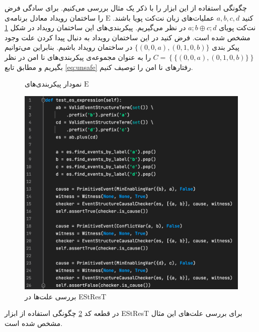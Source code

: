 \documentclass[
msc,
irfonts
]{./tex/tehran-thesis}
\newcommand{\پ}{پروژه/پایان‌نامه/رساله }
\theoremstyle{definition}
\theoremstyle{theorem}
\theoremstyle{definition}
\numberwithin{algorithm}{chapter}
\newcommand{\s}[1]{\{#1\}}
\newcommand{\crd}[4][above]{
    \node[draw,circle,inner sep=2pt,fill,label={[#1]:#4}] at (#2,#3) {};
}
\newcommand{\mr}[1]{\mathrm{#1}}
\begin{document}
چگونگی استفاده از این ابزار را با ذکر یک مثال بررسی می‌کنیم.
برای سادگی فرض کنید 
$a,b,c,d$
عملیات‌های زبان نت‌کت پویا باشند.
$\mr{E}$
را ساختمان رویداد معادل برنامه‌ی نت‌کت پویای 
$a;b \oplus c;d$
در نظر می‌گیریم.
پیکربندی‌های این ساختمان رویداد در شکل 
\ref{ex:impl:es}
مشخص شده است.
فرض کنید در این ساختمان رویداد به دنبال پیدا کردن علت
وجود پیکر بندی
$\s{(0,0,a),(0,1,0,b)}$
در ساختمان رویداد باشیم.
بنابراین می‌توانیم
$C = \left\{  \s{(0,0,a),(0,1,0,b)}\right\}$
را به عنوان مجموعه‌ی پیکر‌بندی‌های نا امن در نظر 
بگیریم و مطابق تابع
\ref{eq:unsafe}
رفتار‌های نا امن را توصیف کنیم.
\begin{figure}
    \centering
    \caption{نمودار پیکربندی‌های 
    $\mr{E}$
    }
    \label{ex:impl:es}
\end{figure}
\begin{figure}
    \centering
    \includegraphics[width=15cm]{impl.png}
    \caption{بررسی علت‌ها در 
        EStResT 
    }
    \label{ex:impl:code}
\end{figure}
در قطعه کد 
\ref{ex:impl:code}
چگونگی استفاده از ابزار 
EStResT
برای بررسی علت‌های این مثال مشخص شده است.
\end{document}
